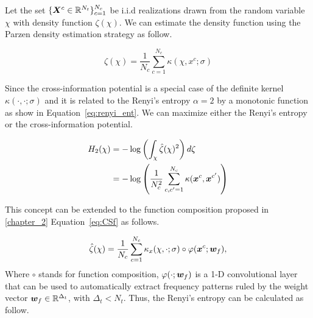 Let the set $\{\bm {X}^c \in \mathbb{R}^{N_t} \}_{c=1}^{N_c}$ be i.i.d realizations drawn from the random variable $\chi$ with density function $\zeta(\chi)$. We can estimate the density function using the Parzen density estimation strategy as follow.

\begin{equation}
    \hat{\zeta}(\chi) = \frac{1}{N_c} \sum_{c=1}^{N_c} \kappa(\chi,x^c ; \sigma)
\end{equation}

Since the cross-information potential is a special case of the definite kernel $\kappa(\cdot,\cdot ; \sigma)$ and it is related to the Renyi's entropy $\alpha=2$ by a monotonic function as show in Equation~\eqref{eq:renyi_ent}. We can maximize either the Renyi's entropy or the cross-information potential.

\begin{equation}\label{eq:renyi_ent}
\begin{aligned}
    H_2(\chi) &= - \log \left( \int_{\chi} \hat{\zeta}(\chi)^2 \right) d\zeta \\
              &= - \log \left( \frac{1}{N_{c}^{2}} \sum_{c,c'=1}^{N_c} \kappa ( \bm {x}^{c} , \bm {x}^{c'} ) \right)
\end{aligned}
\end{equation}

This concept can be extended to the function composition proposed in \cref{chapter_2} Equation~\eqref{eq:CSf} as follows.

\begin{equation}
    \hat{\zeta}(\chi) = \frac{1}{N_c} \sum_{c=1}^{N_c}  {\kappa_{x}}(\chi,\cdot ; \sigma) \circ \varphi(\bm {x}^c; \bm {w}_f), 
\end{equation}
Where $\circ$ stands for function composition, $\varphi(\cdot; \bm {w}_f)$ is a 1-D convolutional layer that can be used to automatically extract frequency patterns ruled by the weight vector $\bm {w}_f\in \mathbb{R}^{\Delta_t}$, with $\Delta_t<N_t$. Thus, the Renyi's entropy can be calculated as follow.


